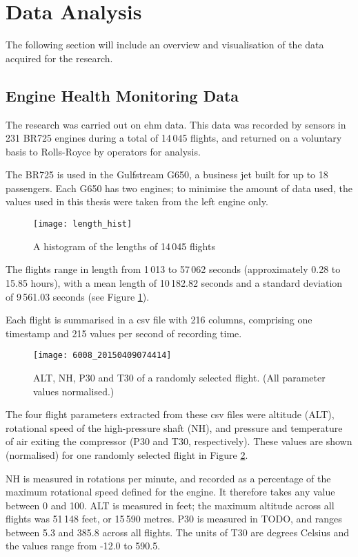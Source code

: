 \section{Data Analysis}
The following section will include an overview and visualisation of the data acquired for the research.

\subsection{Engine Health Monitoring Data} \label{sec:ehm}
The research was carried out on \ac{ehm} data. This data was recorded by sensors in 231 BR725 engines during a total of 14\,045 flights, and returned on a voluntary basis to Rolls-Royce by operators for analysis.

The BR725 is used in the Gulfstream G650, a business jet built for up to 18 passengers. Each G650 has two engines; to minimise the amount of data used, the values used in this thesis were taken from the left engine only.

\begin{figure}[t]
    \centering
    \texttt{[image: length\_hist]}
    \caption{\label{fig:flight_len} A histogram of the lengths of 14\,045 flights}
\end{figure}

The flights range in length from 1\,013 to 57\,062 seconds (approximately 0.28 to 15.85 hours), with a mean length of 10\,182.82 seconds and a standard deviation of 9\,561.03 seconds (see Figure \ref{fig:flight_len}).

Each flight is summarised in a \ac{csv} file with 216 columns, comprising one timestamp and 215 values per second of recording time.

\begin{figure}[ht]
    \centering
    \texttt{[image: 6008\_20150409074414]}
    \caption{\label{fig:flight_example} ALT, NH, P30 and T30 of a randomly selected flight. (All parameter values normalised.)}
\end{figure}

The four flight parameters extracted from these \ac{csv} files were altitude (ALT), rotational speed of the high-pressure shaft (NH), and pressure and temperature of air exiting the compressor (P30 and T30, respectively). These values are shown (normalised) for one randomly selected flight in Figure \ref{fig:flight_example}.

NH is measured in rotations per minute, and recorded as a percentage of the maximum rotational speed defined for the engine. It therefore takes any value between 0 and 100. ALT is measured in feet; the maximum altitude across all flights was 51\,148 feet, or 15\,590 metres. P30 is measured in TODO, and ranges between 5.3 and 385.8 across all flights. The units of T30 are degrees Celsius and the values range from -12.0 to 590.5.

